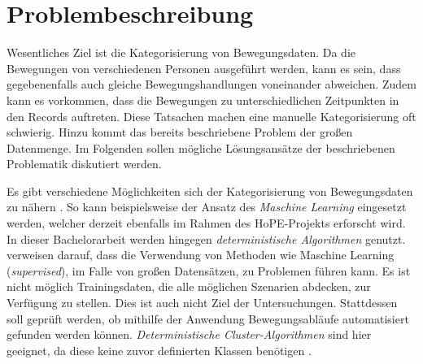 \clearpage
\section{Problembeschreibung}
\label{2-Problembeschreibung}
Wesentliches Ziel ist die Kategorisierung von Bewegungsdaten.
Da die Bewegungen von verschiedenen Personen ausgeführt werden,
kann es sein, dass gegebenenfalls auch gleiche Bewegungshandlungen voneinander abweichen.
Zudem kann es vorkommen, dass die Bewegungen zu unterschiedlichen Zeitpunkten in den Records auftreten.
Diese Tatsachen machen eine manuelle Kategorisierung oft schwierig.
Hinzu kommt das bereits beschriebene Problem der großen Datenmenge.
Im Folgenden sollen mögliche Lösungsansätze der beschriebenen Problematik diskutiert werden.

Es gibt verschiedene Möglichkeiten sich der Kategorisierung von Bewegungsdaten zu nähern \citet{aghabozorgi_time-series_2015}.
So kann beispielsweise der Ansatz des \emph{Maschine Learning} eingesetzt werden,
welcher derzeit ebenfalls im Rahmen des HoPE-Projekts erforscht \citep{plischke_master_2022} wird.
In dieser Bachelorarbeit werden hingegen \emph{deterministische Algorithmen} genutzt.
\citet{aghabozorgi_time-series_2015} verweisen darauf, dass die Verwendung von Methoden
wie Maschine Learning (\emph{supervised}), im Falle von großen Datensätzen, zu Problemen führen kann.
Es ist nicht möglich Trainingsdaten, die alle möglichen Szenarien abdecken, zur Verfügung zu stellen.
Dies ist auch nicht Ziel der Untersuchungen.
Stattdessen soll geprüft werden,
ob mithilfe der Anwendung Bewegungsabläufe automatisiert gefunden werden können.
\emph{Deterministische Cluster-Algorithmen} sind hier geeignet,
da diese keine zuvor definierten Klassen benötigen \citep{aghabozorgi_time-series_2015}.

